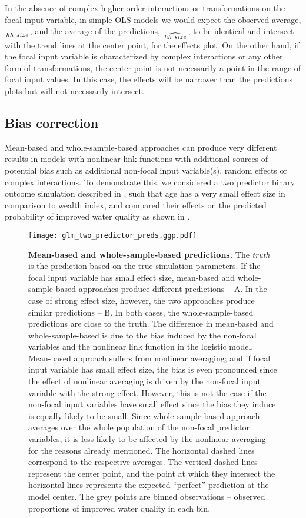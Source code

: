 In the absence of complex higher order interactions or transformations on the focal input variable, in simple OLS models we would expect the observed average, $\over{hh~size}$, and the average of the predictions, $\over{\widehat{hh~size}}$, to be identical and intersect with the trend lines at the center point, for the effects plot. On the other hand, if the focal input variable is characterized by complex interactions or any other form of transformations, the center point is not necessarily a point in the range of focal input values. In this case, the effects will be narrower than the predictions plots but will not necessarily intersect. 


\subsection{Bias correction}

Mean-based and whole-sample-based approaches can produce very different results in models with nonlinear link functions with additional sources of potential bias such as additional non-focal input variable(s), random effects or complex interactions. To demonstrate this, we considered a two predictor binary outcome simulation described in , such that age has a very small effect size in comparison to wealth index, and compared their effects on the predicted probability of improved water quality as shown in . 

\begin{figure}
\begin{center}
\texttt{[image: glm\_two\_predictor\_preds.ggp.pdf]}
\end{center}
\caption{{\bf Mean-based and whole-sample-based predictions.} The \emph{truth} is the prediction based on the true simulation parameters. If the focal input variable has small effect size, mean-based and whole-sample-based approaches produce different predictions -- A. In the case of strong effect size, however, the two approaches produce similar predictions -- B. In both cases, the whole-sample-based predictions are close to the truth. The difference in mean-based and whole-sample-based is due to the bias induced by the non-focal variables and the nonlinear link function in the logistic model. Mean-based approach suffers from nonlinear averaging; and if focal input variable has small effect size, the bias is even pronounced since the effect of nonlinear averaging is driven by the non-focal input variable with the strong effect. However, this is not the case if the non-focal input variables have small effect since the bias they induce is equally likely to be small. Since whole-sample-based approach averages over the whole population of the non-focal predictor variables, it is less likely to be affected by the nonlinear averaging for the reasons already mentioned. The horizontal dashed lines correspond to the respective averages. The vertical dashed lines represent the center point, and the point at which they intersect the horizontal lines represents the expected ``perfect'' prediction at the model center. The grey points are binned observations -- observed proportions of improved water quality in each bin.} 
\label{fig:pred_bin_plots}
\end{figure}


